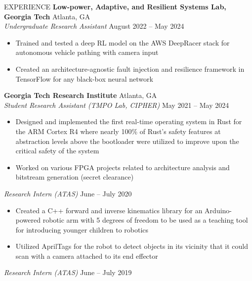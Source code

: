 \documentclass{resume} %
\begin{document}
\vspace{-0.8em}
\begin{rSection}{EXPERIENCE}
\textbf{Low-power, Adaptive, and Resilient Systems Lab, Georgia Tech} \hfill Atlanta, GA\\
\textit{Undergraduate Research Assistant} \hfill August 2022 -- May 2024
\vspace{-0.5em}
   \begin{itemize}
      \itemsep -5pt {} 
      \item Trained and tested a deep RL model on the AWS DeepRacer stack for autonomous vehicle pathing with camera input
      \item Created an architecture-agnostic fault injection and resilience framework in TensorFlow
      for any black-box neural network
   \end{itemize}
\vspace{-0.5em}
\textbf{Georgia Tech Research Institute} \hfill Atlanta, GA\\
\textit{Student Research Assistant (TMPO Lab, CIPHER)} \hfill May 2021 -- May 2024
\vspace{-0.5em}
 \begin{itemize}
    \itemsep -5pt {} 
     \item Designed and implemented the first real-time operating system in Rust for the ARM Cortex R4 where
     nearly 100\% of Rust's safety features at abstraction levels above the bootloader were utilized to improve
     upon the critical safety of the system
     \item Worked on various FPGA projects related to architecture analysis and bitstream generation (secret clearance)
 \end{itemize}
\vspace{-0.5em}
\textit{Research Intern (ATAS)} \hfill June -- July 2020
\vspace{-0.5em}
 \begin{itemize}
    \itemsep -5pt {} 
     \item Created a C++ forward and inverse kinematics library for an Arduino-powered robotic arm with 5 degrees
     of freedom to be used as a teaching tool for introducing younger children to robotics
     \item Utilized AprilTags for the robot to detect objects in its vicinity that it could
     scan with a camera attached to its end effector
 \end{itemize}
\vspace{-0.5em}
\textit{Research Intern (ATAS)} \hfill June -- July 2019

\end{rSection}
\end{document}
